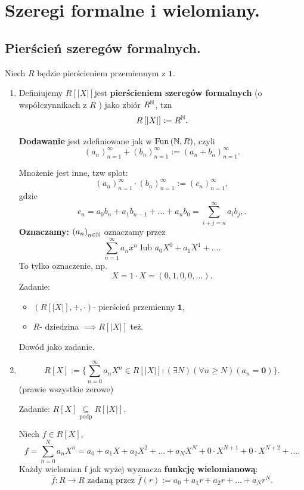 \chapter{Szeregi formalne i wielomiany.}

\section{Pierścień szeregów formalnych.}
\begin{definition}
	Niech $R$ będzie pierścieniem przemiennym z $\mathbf{1}$. 
	
	\begin{enumerate}[label=\arabic*)]
		\item 
	Definiujemy $R\left[ \left| X \right|  \right] $jest \textbf{pierścieniem szeregów formalnych } (o współczynnikach z $R$ ) jako zbiór $R^{\mathbb{N}}$, tzn
	\[
	R\left[ \left| X \right|  \right] := R^{\mathbb{N}}
	.\] 

	\noindent \textbf{Dodawanie} jest zdefiniowane jak w $\text{Fun}\left( \mathbb{N},R \right) $, czyli
	\[
		\left( a_{n} \right)_{n=1}^{\infty} +  \left( b_{n}  \right) _{n=1}^{\infty} := \left( a_{n} +b_{n}  \right) _{n=1}^{\infty}
	.\] 

	\noindent  Mnożenie jest inne, tzw splot:
	\[              
		\left( a_{n} \right)_{n=1}^{\infty} \cdot   \left( b_{n}  \right) _{n=1}^{\infty} := \left( c_{n}  \right) _{n=1}^{\infty}
	,\] 
	gdzie
	\[
		c_{n} = a_0b_{n} + a_1b_{n-1} + \ldots + a_{n}b_{0} = \sum_{i+j = n}^{\infty} a_{i}b_{j},
	.\] 
	\textbf{Oznaczamy:} $\left( a_{n} \right)_{n\in \mathbb{N}}$ oznaczamy przez
	\[
	\sum_{n = 1}^{\infty} a_{n}x^{n}\text{ lub } a_{0}X^{0} + a_{1}X^{1} + \ldots
	.\] 
	To tylko oznaczenie, np. 
	\[
	X = 1\cdot X = \left( 0,1,0,0,\ldots \right) 
	.\] 
	Zadanie:
	\begin{itemize}
		\item $\left( R\left[ \left| X \right|  \right] , +, \cdot  \right) $- pierścień przemienny $\mathbf{1}$,
		\item $R$- dziedzina $\implies R\left[ \left| X \right|  \right] $ też.
	\end{itemize}
	Dowód jako zadanie.
		\item 
			\[
			R\left[ X \right] := \{\sum_{n=0}^{\infty} a_{n} X^{n}\in R\left[ \left| X \right|  \right]: \left(\exists N \right)\left(\forall n \ge N \right) \left( a_{n} = \mathbf{0} \right)  \} 
			.\] 
			(prawie wszystkie zerowe)

			Zadanie: $R\left[ X \right] \underset{\scriptscriptstyle\text{podp}}{\subseteq} R\left[ \left| X \right|  \right].$
			
			Niech $f\in R\left[ X \right] $, 
			\[
			f = \sum_{n=0}^{N} a_{n} X^{n} = a_0 + a_1X + a_2X^2 + \ldots + a_{N}X^{N} + 0\cdot X^{N+1} + 0\cdot X^{N+2} + \ldots
			.\] 
			Każdy wielomian f jak wyżej wyznacza \textbf{funkcję wielomianową}:
			\[
			\overline{f}: R\to R \text{ zadaną przez } \overline{f}\left( r \right) := a_0 + a_1r + a_2r + \ldots + a_{N}r^{N}
			.\] 
	\end{enumerate}
\end{definition} 
